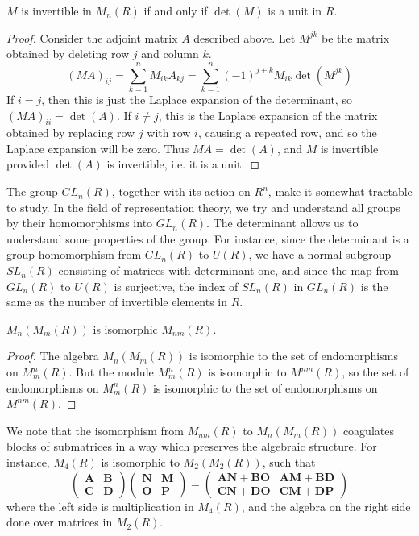 \begin{theorem}
    $M$ is invertible in $M_n(R)$ if and only if $\det(M)$ is a unit in $R$.
\end{theorem}
\begin{proof}
    Consider the adjoint matrix $A$ described above. Let $M^{jk}$ be the matrix obtained by deleting row $j$ and column $k$.
    \[ (MA)_{ij} = \sum_{k = 1}^n M_{ik} A_{kj} = \sum_{k = 1}^n (-1)^{j + k} M_{ik} \det(M^{jk}) \]
    If $i = j$, then this is just the Laplace expansion of the determinant, so $(MA)_{ii} = \det(A)$. If $i \neq j$, this is the Laplace expansion of the matrix obtained by replacing row $j$ with row $i$, causing a repeated row, and so the Laplace expansion will be zero. Thus $MA = \det(A)$, and $M$ is invertible provided $\det(A)$ is invertible, i.e. it is a unit.
\end{proof}

The group $GL_n(R)$, together with its action on $R^n$, make it somewhat tractable to study. In the field of representation theory, we try and understand all groups by their homomorphisms into $GL_n(R)$. The determinant allows us to understand some properties of the group. For instance, since the determinant is a group homomorphism from $GL_n(R)$ to $U(R)$, we have a normal subgroup $SL_n(R)$ consisting of matrices with determinant one, and since the map from $GL_n(R)$ to $U(R)$ is surjective, the index of $SL_n(R)$ in $GL_n(R)$ is the same as the number of invertible elements in $R$.

\begin{theorem}
    $M_n(M_m(R))$ is isomorphic $M_{nm}(R)$.
\end{theorem}
\begin{proof}
    The algebra $M_n(M_m(R))$ is isomorphic to the set of endomorphisms on $M^n_m(R)$. But the module $M^n_m(R)$ is isomorphic to $M^{nm}(R)$, so the set of endomorphisms on $M^n_m(R)$ is isomorphic to the set of endomorphisms on $M^{nm}(R)$.
\end{proof}

We note that the isomorphism from $M_{nm}(R)$ to $M_n(M_m(R))$ coagulates blocks of submatrices in a way which preserves the algebraic structure. For instance, $M_{4}(R)$ is isomorphic to $M_2(M_2(R))$, such that
%
\[ \begin{pmatrix} \mathbf{A} & \mathbf{B} \\ \mathbf{C} & \mathbf{D} \end{pmatrix} \begin{pmatrix} \mathbf{N} & \mathbf{M} \\ \mathbf{O} & \mathbf{P} \end{pmatrix} = \begin{pmatrix} \mathbf{A} \mathbf{N} + \mathbf{B} \mathbf{O} & \mathbf{A} \mathbf{M} + \mathbf{B} \mathbf{D} \\ \mathbf{C} \mathbf{N} + \mathbf{D} \mathbf{O} & \mathbf{C} \mathbf{M} + \mathbf{D} \mathbf{P} \end{pmatrix} \]
%
where the left side is multiplication in $M_4(R)$, and the algebra on the right side done over matrices in $M_2(R)$.

